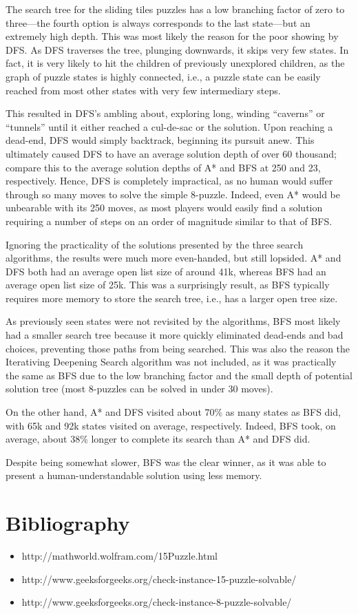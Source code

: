 \documentclass{article}
\begin{document}
  The search tree for the sliding tiles puzzles has a low branching factor of
  zero to three---the fourth option is always corresponds to the last
  state---but
  an extremely high depth. This was most likely the reason for the poor showing
  by DFS. As DFS traverses the tree, plunging downwards, it skips very few
  states. In fact,
  it is very likely to hit the children of previously unexplored children, as
  the graph of puzzle states is highly connected, i.e., a puzzle state can be
  easily reached from most other states with very few intermediary steps.

  This resulted in DFS's ambling about, exploring long, winding ``caverns'' or
  ``tunnels'' until it either reached a cul-de-sac or the solution. Upon
  reaching a dead-end, DFS would simply backtrack, beginning its pursuit anew.
  This ultimately caused DFS to have an average solution depth of over 60
  thousand; compare this to the average solution depths of A* and BFS at
  250 and 23, respectively. Hence, DFS is completely impractical, as no human
  would suffer through so many moves to solve the simple 8-puzzle. Indeed, even
  A* would be unbearable with its 250 moves, as most players would easily find a
  solution requiring a number of steps on an order of magnitude similar to that
  of BFS.

  Ignoring the practicality of the solutions presented by the three search
  algorithms, the results were much more even-handed, but still lopsided.
  A* and DFS both had an average open list size of around 41k, whereas BFS had
  an average open list size of 25k. This was a surprisingly result, as BFS
  typically requires more memory to store the search tree, i.e., has a larger
  open tree size.

  As previously seen states were not revisited by the
  algorithms, BFS most likely had a smaller search tree because it more quickly
  eliminated dead-ends and bad choices, preventing those paths from being
  searched. This was also the reason the Iterativing Deepening Search algorithm
  was not included, as it was practically the same as BFS due to the low
  branching factor and the small depth of potential solution tree (most
  8-puzzles can be solved in under 30 moves).

  On the other hand, A* and DFS visited about 70\% as many states as BFS did,
  with 65k and 92k states visited on average, respectively. Indeed, BFS took,
  on average, about 38\% longer to complete its search than A* and DFS did.

  Despite being somewhat slower, BFS was the clear winner, as it was able to
  present a human-understandable solution using less memory.

\vfill
\section*{Bibliography}
  \begin{itemize}
    \item http://mathworld.wolfram.com/15Puzzle.html
    \item http://www.geeksforgeeks.org/check-instance-15-puzzle-solvable/
    \item http://www.geeksforgeeks.org/check-instance-8-puzzle-solvable/
  \end{itemize}
\end{document}

